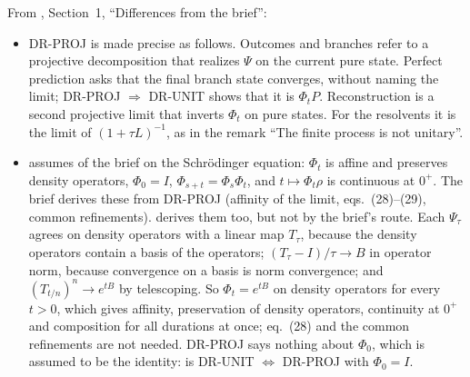 \documentclass[11pt]{article}
\begin{document}
\noindent
From , Section~1, ``Differences from the brief'':
\begin{itemize}
\item DR-PROJ is made precise as follows. Outcomes and branches refer to a projective
  decomposition that realizes $\Psi$ on the current pure state. Perfect prediction asks that the
  final branch state converges, without naming the limit; DR-PROJ $\Rightarrow$ DR-UNIT shows that
  it is $\Phi_tP$. Reconstruction is a second projective limit that inverts $\Phi_t$ on pure
  states. For the resolvents it is the limit of $(1 + \tau L)^{-1}$, as in the remark ``The
  finite process is not unitary''.
\item {} assumes  of the brief on the Schr\"odinger
  equation: $\Phi_t$ is affine and preserves density operators, $\Phi_0 = I$,
  $\Phi_{s+t} = \Phi_s\Phi_t$, and $t \mapsto \Phi_t\rho$ is continuous at $0^+$. The brief
  derives these from DR-PROJ (affinity of the limit, eqs.~(28)--(29), common refinements).
   derives them too, but not by the brief's route. Each
  $\Psi_\tau$ agrees on density operators with a linear map $T_\tau$, because the density
  operators contain a basis of the operators; $(T_\tau - I)/\tau \to B$ in operator norm, because
  convergence on a basis is norm convergence; and $(T_{t/n})^n \to e^{tB}$ by telescoping. So
  $\Phi_t = e^{tB}$ on density operators for every $t > 0$, which gives affinity, preservation of
  density operators, continuity at $0^+$ and composition for all durations at once; eq.~(28) and
  the common refinements are not needed. DR-PROJ says nothing about $\Phi_0$, which is assumed to
  be the identity:  is DR-UNIT $\Leftrightarrow$ DR-PROJ
  with $\Phi_0 = I$.
\end{itemize}
\end{document}
